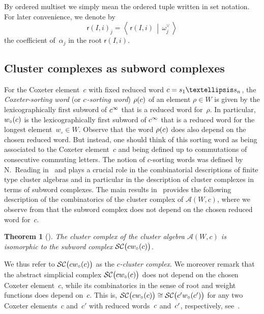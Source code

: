 \documentclass[10pt]{amsart}
\newtheorem{theo}{Theorem}[section]
\theoremstyle{definition}\newtheorem{rema}[theo]{Remark}\newtheorem{exem}[theo]{Example}
\newcommand{\Dfn}[1]{\emph{#1}}
\newcommand{\Alg}{\mathcal{A}}
\newcommand{\subwordComplex}{\mathcal{SC}}
\newcommand{\clusterComplex}{\subwordComplex\big(\cw{c}\big)}
\newcommand{\sq}[1]{{\rm #1}}
\newcommand{\s}{\sq{s}}
\newcommand{\sfr}{\mathsf{r}}
\newcommand{\wo}{{w_\circ}}
\renewcommand{\c}{\sq{c}}
\newcommand{\sw}[2]{\sq{#1}(\sq{#2})}
\newcommand{\cwo}[1]{\sw{\wo}{#1}}
\newcommand{\cw}[1]{\sq{#1}\cwo{#1}}
\newcommand{\Root}[2]{{\sfr}(#1,#2)}
\newcommand{\dotprod}[2]{\left\langle \, #1 \,\middle|\, #2 \, \right\rangle}
\begin{document}
By ordered multiset we simply mean the ordered tuple written in set notation. For later convenience, we denote by
\[
\Root{I}{i}_j = \dotprod{\Root{I}{i}}{\omega_j^\vee}
\]
the coefficient of~$\alpha_j$ in the root $\Root{I}{i}$.
\subsection{Cluster complexes as subword complexes}\label{sec:clustercomplexes}

For the Coxeter element~$c$ with fixed reduced word $\c = \s_1\dots\s_n$, the \Dfn{Coxeter-sorting word} (or \Dfn{$\c$-sorting word}) $\rho(\c)$ of an element $\rho \in W$ is given by the lexicographically first subword of $\c^\infty$ that is a reduced word for~$\rho$. In particular, $\cwo{c}$ is the lexicographically first subword of $\c^\infty$ that is a reduced word for the longest element~$\wo \in W$. Observe that the word $\rho(\c)$ does also depend on the chosen reduced word. But instead, one should think of this sorting word as being associated to the Coxeter element~$c$ and being defined up to commutations of consecutive commuting letters. The notion of $c$-sorting words was defined by N.~Reading in~\cite{R2007} and plays a crucial role in the combinatorial descriptions of finite type cluster algebras and in particular in the description of cluster complexes in terms of subword complexes. The main results in~\cite{CLS2014} provides the following description of the combinatorics of the cluster complex of $\Alg(W,c)$, where we observe from  that the subword complex does not depend on the chosen reduced word for~$c$.

\begin{theo}[{\cite[Theorem~2.2]{CLS2014}}]\label{thm:cluster1}
The cluster complex of the cluster algebra $\Alg(W,c)$ is isomorphic to the subword complex $\clusterComplex$.
\end{theo}

We thus refer to $\clusterComplex$ as the \Dfn{$c$-cluster complex}. We moreover remark that the abstract simplicial complex $\clusterComplex$ does not depend on the chosen Coxeter element~$c$, while its combinatorics in the sense of root and weight functions does depend on~$c$. This is, $\subwordComplex\big(\cw{c}\big) \cong \subwordComplex\big(\cw{c'}\big)$ for any two Coxeter elements~$c$ and~$c'$ with reduced words~$\c$ and~$\c'$, respectively, see~\cite[Theorem~2.6]{CLS2014}.

\end{document}
